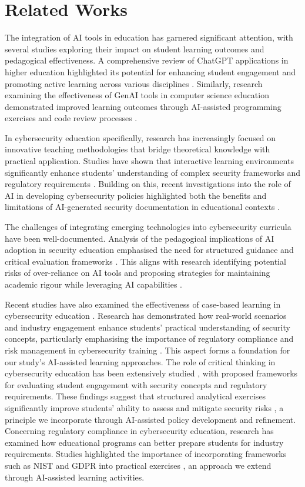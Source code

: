 \section{Related Works}
The integration of AI tools in education has garnered significant attention, with several studies exploring their impact on student learning outcomes and pedagogical effectiveness. A comprehensive review of ChatGPT applications in higher education highlighted its potential for enhancing student engagement and promoting active learning across various disciplines \cite{rasul2023role}. Similarly, research examining the effectiveness of GenAI tools in computer science education demonstrated improved learning outcomes through AI-assisted programming exercises and code review processes \cite{cubillos2025generative}.

In cybersecurity education specifically, research has increasingly focused on innovative teaching methodologies that bridge theoretical knowledge with practical application. Studies have shown that interactive learning environments significantly enhance students' understanding of complex security frameworks and regulatory requirements \cite{marsa2013design}. Building on this, recent investigations into the role of AI in developing cybersecurity policies highlighted both the benefits and limitations of AI-generated security documentation in educational contexts \cite{anandita2023role}.

The challenges of integrating emerging technologies into cybersecurity curricula have been well-documented. Analysis of the pedagogical implications of AI adoption in security education emphasised the need for structured guidance and critical evaluation frameworks \cite{shchavinsky2023application}. This aligns with research identifying potential risks of over-reliance on AI tools and proposing strategies for maintaining academic rigour while leveraging AI capabilities \cite{zhai2024effects}.

Recent studies have also examined the effectiveness of case-based learning in cybersecurity education \cite{anderson2024case}. Research has demonstrated how real-world scenarios and industry engagement enhance students' practical understanding of security concepts, particularly emphasising the importance of regulatory compliance and risk management in cybersecurity training \cite{alnajim2023exploring}. This aspect forms a foundation for our study's AI-assisted learning approaches.
The role of critical thinking in cybersecurity education has been extensively studied \cite{nowduri2018critical}, with proposed frameworks for evaluating student engagement with security concepts and regulatory requirements. These findings suggest that structured analytical exercises significantly improve students' ability to assess and mitigate security risks \cite{crabb2024critical}, a principle we incorporate through AI-assisted policy development and refinement.
Concerning regulatory compliance in cybersecurity education, research has examined how educational programs can better prepare students for industry requirements. Studies highlighted the importance of incorporating frameworks such as NIST and GDPR into practical exercises \cite{hajny2021framework}, an approach we extend through AI-assisted learning activities.

